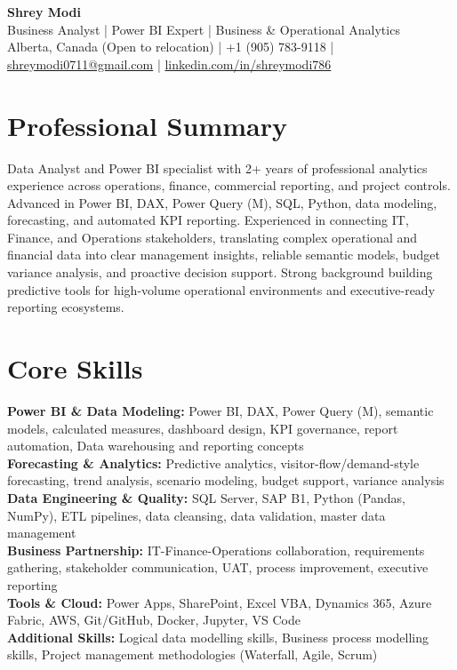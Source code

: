 \documentclass[10.5pt,letterpaper]{article}
\begin{document}
\begin{center}
  {\Huge \bfseries \color{accent} Shrey Modi}\\[0.35em]
  {\normalsize Business Analyst | Power BI Expert | Business \& Operational Analytics}\\[0.25em]
  {\small
    Alberta, Canada (Open to relocation)
 | +1 (905) 783-9118 | \href{mailto:shreymodi0711@gmail.com}{shreymodi0711@gmail.com} | \href{https://linkedin.com/in/shreymodi786}{linkedin.com/in/shreymodi786}  }
\end{center}

\section{Professional Summary}
\noindent Data Analyst and Power BI specialist with 2+ years of professional analytics experience across operations, finance, commercial reporting, and project controls. Advanced in Power BI, DAX, Power Query (M), SQL, Python, data modeling, forecasting, and automated KPI reporting. Experienced in connecting IT, Finance, and Operations stakeholders, translating complex operational and financial data into clear management insights, reliable semantic models, budget variance analysis, and proactive decision support. Strong background building predictive tools for high-volume operational environments and executive-ready reporting ecosystems.


\section{Core Skills}
\noindent
\textbf{Power BI \& Data Modeling:} Power BI, DAX, Power Query (M), semantic models, calculated measures, dashboard design, KPI governance, report automation, Data warehousing and reporting concepts\\
\textbf{Forecasting \& Analytics:} Predictive analytics, visitor-flow/demand-style forecasting, trend analysis, scenario modeling, budget support, variance analysis\\
\textbf{Data Engineering \& Quality:} SQL Server, SAP B1, Python (Pandas, NumPy), ETL pipelines, data cleansing, data validation, master data management\\
\textbf{Business Partnership:} IT-Finance-Operations collaboration, requirements gathering, stakeholder communication, UAT, process improvement, executive reporting\\
\textbf{Tools \& Cloud:} Power Apps, SharePoint, Excel VBA, Dynamics 365, Azure Fabric, AWS, Git/GitHub, Docker, Jupyter, VS Code\\
\textbf{Additional Skills:} Logical data modelling skills, Business process modelling skills, Project management methodologies (Waterfall, Agile, Scrum)\\
\end{document}
